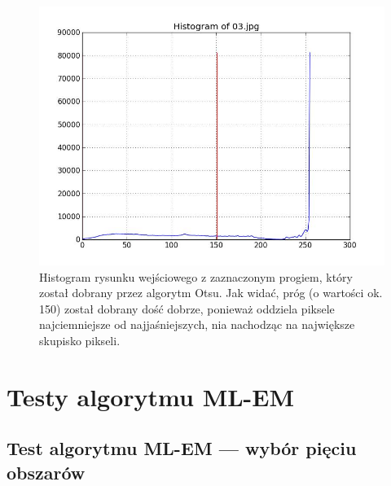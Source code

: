 \documentclass[10pt]{llncs}
\begin{document}
\begin{figure}[h!]
  \centering
  \includegraphics[scale=.3, clip]{img/04_histogram.jpg}
	\caption[]
  {Histogram rysunku wejściowego z zaznaczonym progiem, który został dobrany przez algorytm Otsu. Jak widać, próg (o wartości ok. 150) został dobrany dość dobrze, ponieważ oddziela piksele najciemniejsze od najjaśniejszych, nia nachodząc na największe skupisko pikseli.}
\end{figure}

\section{Testy algorytmu ML-EM}

\subsection{Test algorytmu ML-EM --- wybór pięciu obszarów}
\end{document}
